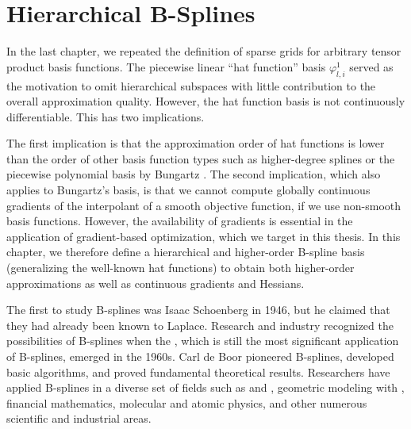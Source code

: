 
\chapter{Hierarchical B-Splines}
\label{chap:30BSplines}




In the last chapter, we repeated the definition of sparse grids for
arbitrary tensor product basis functions.
The piecewise linear ``hat function'' basis $\varphi_{l,i}^1$
served as the motivation to omit hierarchical subspaces with
little contribution to the overall approximation quality.
However, the hat function basis is not continuously differentiable.
This has two implications.

The first implication is that the approximation order of hat functions
is lower than the order of other basis function types
such as higher-degree splines or the piecewise polynomial basis
by Bungartz \cite{Bungartz98Finite}.
The second implication, which also applies to Bungartz's basis,
is that we cannot compute globally continuous gradients of the
interpolant of a smooth objective function,
if we use non-smooth basis functions.
However, the availability of gradients is
essential in the application of gradient-based optimization,
which we target in this thesis.
In this chapter, we therefore define a hierarchical and
higher-order B-spline basis
(generalizing the well-known hat functions)
to obtain both higher-order approximations
as well as continuous gradients and Hessians.

The first to study B-splines was Isaac Schoenberg in 1946,
but he claimed that they had already been known to Laplace.
Research and industry recognized the possibilities of B-splines when
the \fem, which is still the most significant application of B-splines,
emerged in the 1960s.
Carl de Boor pioneered B-splines, developed basic algorithms, and
proved fundamental theoretical results.
Researchers have applied B-splines in a diverse set of fields such as
\fem and \iga,
geometric modeling with \nurbs,
financial mathematics,
molecular and atomic physics,
and other numerous scientific and industrial areas.


